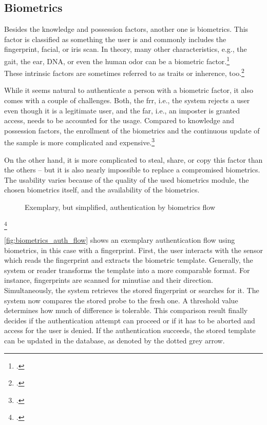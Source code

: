 \subsection{Biometrics}

Besides the knowledge and possession factors, another one is biometrics. This factor is classified as \frqq something the user is\flqq{} and commonly includes the fingerprint, facial, or iris scan. In theory, many other characteristics, e.g., the gait, the ear, DNA, or even the human odor can be a biometric factor.\footcite[See][30--34]{Jain2011}\\
These intrinsic factors are sometimes referred to as traits or inherence, too.\footcite[See][186]{dasgupta2017multi}

While it seems natural to authenticate a person with a biometric factor, it also comes with a couple of challenges. Both, the \gls{frr}, i.e., the system rejects a user even though it is a legitimate user, and the \gls{far}, i.e., an imposter is granted access, needs to be accounted for the usage. Compared to knowledge and possession factors, the enrollment of the biometrics and the continuous update of the sample is more complicated and expensive.\footcites[See][18--24]{Jain2011}[See][34--37]{265831}

On the other hand, it is more complicated to steal, share, or copy this factor than the others -- but it is also nearly impossible to replace a compromised biometrics. The usability varies because of the quality of the used biometrics module, the chosen biometrics itself, and the availability of the biometrics.

\begin{figure}[hbt]
	\centering
	
	\caption[Exemplary, but simplified, authentication by biometrics flow]{Exemplary, but simplified, authentication by biometrics flow\footnotemark}
	\label{fig:biometrics_auth_flow}
\end{figure}
\footcitetext[Source: diagram by author, based on][11]{Jain2011}

\autoref{fig:biometrics_auth_flow} shows an exemplary authentication flow using biometrics, in this case with a fingerprint. First, the user interacts with the sensor which reads the fingerprint and extracts the biometric template. Generally, the system or reader transforms the template into a more comparable format. For instance, fingerprints are scanned for minutiae and their direction. Simultaneously, the system retrieves the stored fingerprint or searches for it. The system now compares the stored probe to the fresh one. A threshold value determines how much of difference is tolerable. This comparison result finally decides if the authentication attempt can proceed or if it has to be aborted and access for the user is denied. If the authentication succeeds, the stored template can be updated in the database, as denoted by the dotted grey arrow.


